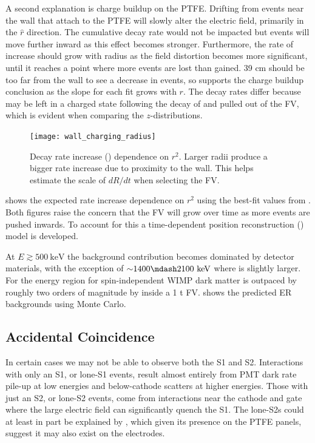 A second explanation is charge buildup on the PTFE.  Drifting \electron from events near the wall that attach to the PTFE will slowly
alter the electric field, primarily in the $\hat{r}$ direction.  The cumulative decay rate would not be impacted but events will move
further inward as this effect becomes stronger.  Furthermore, the rate of increase should grow with radius as the field distortion
becomes more significant, until it reaches a point where more events are lost than gained.  39 cm should be too far from the wall
to see a decrease in events, so
 supports the charge buildup conclusion as the slope for each fit grows with $r$.  The
decay rates differ because  may be left in a charged state following the decay of  and pulled out of the
FV, which is evident when comparing the $z$-distributions.

\begin{figure}
\centering
\texttt{[image: wall\_charging\_radius]}
\caption{Decay rate increase () dependence on $r^2$.  Larger radii produce a bigger rate increase due
to proximity to the wall.  This helps estimate the scale of $dR/dt$ when selecting the FV.}
\label{fig:backgrounds_detector_materials_wall_charge_radius}
\end{figure}

 shows the expected rate increase dependence on $r^2$ using the best-fit
values from .  Both figures
raise the concern that the FV will grow over time as more events are pushed inwards.  To account for this a time-dependent position
reconstruction () model is developed.

At $E \gtrsim 500\ \mathrm{keV}$ the background contribution becomes dominated by detector materials, with the exception of
${\sim} 1400 \mdash 2100\ \mathrm{keV}$ where  is slightly larger.  For the energy region for spin-independent WIMP dark
matter  is outpaced by roughly two orders of magnitude by  inside a 1 t
FV.   shows the predicted ER backgrounds using Monte Carlo.



\subsection{Accidental Coincidence}
\label{subsec:backgrounds_ac}
In certain cases we may not be able to observe both the S1 and S2.  Interactions with only an S1, or lone-S1 events, result almost
entirely from PMT dark rate pile-up at low energies and below-cathode scatters at higher energies.  Those with just an S2, or lone-S2
events, come from interactions near the cathode and gate where the large electric field can significantly quench the S1.  The lone-S2s
could at least in part be explained by , which given its presence on the PTFE panels, suggest it may also exist on the
electrodes.

